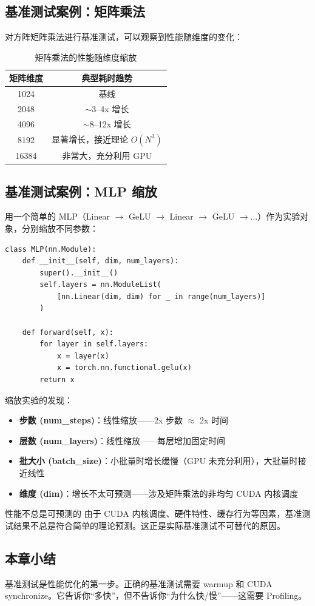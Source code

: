 \subsection{基准测试案例：矩阵乘法}

对方阵矩阵乘法进行基准测试，可以观察到性能随维度的变化：

\begin{table}[H]
\centering
\begin{tabular}{cc}
\toprule
\textbf{矩阵维度} & \textbf{典型耗时趋势} \\
\midrule
1024 & 基线 \\
2048 & $\sim$3--4x 增长 \\
4096 & $\sim$8--12x 增长 \\
8192 & 显著增长，接近理论 $O(N^3)$ \\
16384 & 非常大，充分利用 GPU \\
\bottomrule
\end{tabular}
\caption{矩阵乘法的性能随维度缩放}
\end{table}

\subsection{基准测试案例：MLP 缩放}

用一个简单的 MLP（Linear $\rightarrow$ GeLU $\rightarrow$ Linear $\rightarrow$ GeLU $\rightarrow \ldots$）作为实验对象，分别缩放不同参数：

\begin{lstlisting}[caption={MLP 定义}]
class MLP(nn.Module):
    def __init__(self, dim, num_layers):
        super().__init__()
        self.layers = nn.ModuleList(
            [nn.Linear(dim, dim) for _ in range(num_layers)]
        )

    def forward(self, x):
        for layer in self.layers:
            x = layer(x)
            x = torch.nn.functional.gelu(x)
        return x
\end{lstlisting}

缩放实验的发现：
\begin{itemize}
    \item \textbf{步数 (num\_steps)}：线性缩放——2x 步数 $\approx$ 2x 时间
    \item \textbf{层数 (num\_layers)}：线性缩放——每层增加固定时间
    \item \textbf{批大小 (batch\_size)}：小批量时增长缓慢（GPU 未充分利用），大批量时接近线性
    \item \textbf{维度 (dim)}：增长不太可预测——涉及矩阵乘法的非均匀 CUDA 内核调度
\end{itemize}

\begin{knowledgebox}{性能不总是可预测的}
由于 CUDA 内核调度、硬件特性、缓存行为等因素，基准测试结果不总是符合简单的理论预测。这正是实际基准测试不可替代的原因。
\end{knowledgebox}

\subsection{本章小结}

基准测试是性能优化的第一步。正确的基准测试需要 warmup 和 CUDA synchronize。它告诉你``多快''，但不告诉你``为什么快/慢''——这需要 Profiling。


